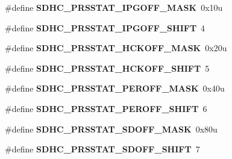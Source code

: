 \begin{DoxyCompactItemize}
\item 
\#define {\bfseries S\+D\+H\+C\+\_\+\+P\+R\+S\+S\+T\+A\+T\+\_\+\+I\+P\+G\+O\+F\+F\+\_\+\+M\+A\+SK}~0x10u\hypertarget{group__SDHC__Register__Masks_ga60c111aa5a4259d9b556a30aa9cbf891}{}\label{group__SDHC__Register__Masks_ga60c111aa5a4259d9b556a30aa9cbf891}

\item 
\#define {\bfseries S\+D\+H\+C\+\_\+\+P\+R\+S\+S\+T\+A\+T\+\_\+\+I\+P\+G\+O\+F\+F\+\_\+\+S\+H\+I\+FT}~4\hypertarget{group__SDHC__Register__Masks_gab62b9ee7261708d8741ea70ecb103520}{}\label{group__SDHC__Register__Masks_gab62b9ee7261708d8741ea70ecb103520}

\item 
\#define {\bfseries S\+D\+H\+C\+\_\+\+P\+R\+S\+S\+T\+A\+T\+\_\+\+H\+C\+K\+O\+F\+F\+\_\+\+M\+A\+SK}~0x20u\hypertarget{group__SDHC__Register__Masks_ga3fea3ced329a19b4f5ef4b596afa1487}{}\label{group__SDHC__Register__Masks_ga3fea3ced329a19b4f5ef4b596afa1487}

\item 
\#define {\bfseries S\+D\+H\+C\+\_\+\+P\+R\+S\+S\+T\+A\+T\+\_\+\+H\+C\+K\+O\+F\+F\+\_\+\+S\+H\+I\+FT}~5\hypertarget{group__SDHC__Register__Masks_gac28dd17af6a554003b82c5ef2a8a29ff}{}\label{group__SDHC__Register__Masks_gac28dd17af6a554003b82c5ef2a8a29ff}

\item 
\#define {\bfseries S\+D\+H\+C\+\_\+\+P\+R\+S\+S\+T\+A\+T\+\_\+\+P\+E\+R\+O\+F\+F\+\_\+\+M\+A\+SK}~0x40u\hypertarget{group__SDHC__Register__Masks_ga6561c88825587d265f09036e40dc741a}{}\label{group__SDHC__Register__Masks_ga6561c88825587d265f09036e40dc741a}

\item 
\#define {\bfseries S\+D\+H\+C\+\_\+\+P\+R\+S\+S\+T\+A\+T\+\_\+\+P\+E\+R\+O\+F\+F\+\_\+\+S\+H\+I\+FT}~6\hypertarget{group__SDHC__Register__Masks_ga5fbe36972520968a101550517bd82895}{}\label{group__SDHC__Register__Masks_ga5fbe36972520968a101550517bd82895}

\item 
\#define {\bfseries S\+D\+H\+C\+\_\+\+P\+R\+S\+S\+T\+A\+T\+\_\+\+S\+D\+O\+F\+F\+\_\+\+M\+A\+SK}~0x80u\hypertarget{group__SDHC__Register__Masks_ga97dde8a6d23e4744d4988349d9d6f581}{}\label{group__SDHC__Register__Masks_ga97dde8a6d23e4744d4988349d9d6f581}

\item 
\#define {\bfseries S\+D\+H\+C\+\_\+\+P\+R\+S\+S\+T\+A\+T\+\_\+\+S\+D\+O\+F\+F\+\_\+\+S\+H\+I\+FT}~7\hypertarget{group__SDHC__Register__Masks_ga8a5f8108789275435c30d3997c194b12}{}\label{group__SDHC__Register__Masks_ga8a5f8108789275435c30d3997c194b12}


\end{DoxyCompactItemize}
